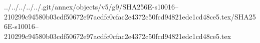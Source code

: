 ../../../../../.git/annex/objects/v5/g9/SHA256E-s10016--210299c94580b03cdf50672e97acdfc0cfac2e4372c50fcd94821edc1cd48ce5.tex/SHA256E-s10016--210299c94580b03cdf50672e97acdfc0cfac2e4372c50fcd94821edc1cd48ce5.tex